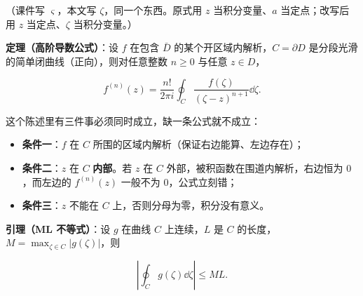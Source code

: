 \documentclass[11pt]{ctexart}
\let\origsubhdr\subhdr
\renewcommand{\subhdr}[1]{\par\origsubhdr{#1}}
\begin{document}
（课件写 $\varsigma$，本文写 $\zeta$，同一个东西。原式用 $z$ 当积分变量、$a$ 当定点；改写后用 $z$ 当定点、$\zeta$ 当积分变量。）



\textbf{定理（高阶导数公式）}：设 $f$ 在包含 $\bar D$ 的某个开区域内解析，$C=\partial D$ 是分段光滑的简单闭曲线（正向），则对任意整数 $n\ge0$ 与任意 $z\in D$，

\begin{equation}
f^{(n)}(z)=\frac{n!}{2\pi i}\oint_C\frac{f(\zeta)}{(\zeta-z)^{n+1}}\dd\zeta .
\tag{3.3}
\end{equation}

这个陈述里有三件事必须同时成立，缺一条公式就不成立：

\begin{itemize}[leftmargin=1.6em]
\item \textbf{条件一}：$f$ 在 $C$ 所围的区域内解析（保证右边能算、左边存在）；
\item \textbf{条件二}：$z$ 在 $C$ \textbf{内部}。若 $z$ 在 $C$ 外部，被积函数在围道内解析，右边恒为 $0$，而左边的 $f^{(n)}(z)$ 一般不为 $0$，公式立刻错；
\item \textbf{条件三}：$z$ 不能在 $C$ 上，否则分母为零，积分没有意义。
\end{itemize}



\textbf{引理（ML 不等式）}：设 $g$ 在曲线 $C$ 上连续，$L$ 是 $C$ 的长度，$M=\max_{\zeta\in C}|g(\zeta)|$，则

\begin{equation}
\left|\oint_C g(\zeta)\dd\zeta\right|\le ML .
\tag{1.2}
\end{equation}

\end{document}
